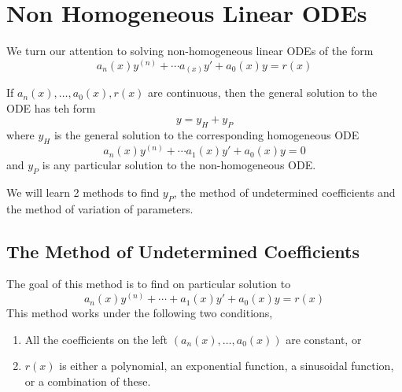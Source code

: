 \documentclass[openany]{report}
\begin{document}
\chapter{Non Homogeneous Linear ODEs}

We turn our attention to solving non-homogeneous linear ODEs of the form 
\[a_n(x)y^{(n)} + \cdots a_(x)y' + a_0(x)y = r(x)\]

\begin{theorem}
    If $a_n(x), \ldots, a_0(x), r(x)$ are continuous, then the general solution to the ODE has teh form 
    \[y = y_H + y_P\]
    where $y_H$ is the general solution to the corresponding homogeneous ODE 
    \[a_n(x)y^{(n)} + \cdots a_1(x)y' + a_0(x)y = 0\]
    and $y_P$ is any particular solution to the non-homogeneous ODE.
\end{theorem}
We will learn 2 methods to find $y_P$, the method of undetermined coefficients and the method of variation of parameters.
\section{The Method of Undetermined Coefficients}
The goal of this method is to find on particular solution to 
\[a_n(x)y^{(n)} + \cdots + a_1(x)y' + a_0(x)y = r(x)\]
This method works under the following two conditions, 
\begin{enumerate}
    \item All the coefficients on the left $(a_n(x), \ldots, a_0(x))$ are constant, or
    \item $r(x)$ is either a polynomial, an exponential function, a sinusoidal function, or a combination of these.
\end{enumerate}
\end{document}
